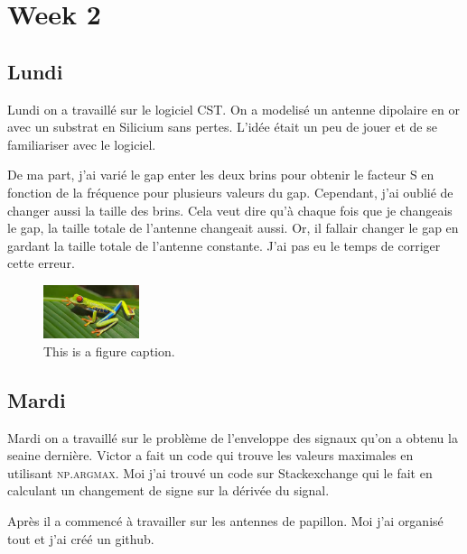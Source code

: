 \section{Week 2}

\subsection{Lundi}

Lundi on a travaillé sur le logiciel CST. On a modelisé un antenne
dipolaire en or avec un substrat en Silicium sans pertes. L'idée
était un peu de jouer et de se familiariser avec le logiciel.

De ma part, j'ai varié le gap enter les deux brins pour obtenir le facteur S
en fonction de la fréquence pour plusieurs valeurs du gap. Cependant, j'ai oublié
de changer aussi la taille des brins. Cela veut dire qu'à chaque fois que je changeais
le gap, la taille totale de l'antenne changeait aussi. Or, il fallair changer le gap
en gardant la taille totale de l'antenne constante. J'ai pas eu le temps de corriger 
cette erreur.

\begin{figure}
    \centering
    \includegraphics[width=0.25\textwidth]{texfigures/frog.jpg}
    \caption{\label{fig:frog1}This is a figure caption.}
\end{figure}

\subsection{Mardi}

Mardi on a travaillé sur le problème de l'enveloppe des signaux qu'on a obtenu la
seaine dernière. Victor a fait un code qui trouve les valeurs maximales en utilisant
\textsc{np.argmax}. Moi j'ai trouvé un code sur Stackexchange qui le fait en calculant
un changement de signe sur la dérivée du signal. 

Après il a commencé à travailler sur les antennes de papillon. Moi j'ai organisé tout et 
j'ai créé un github.